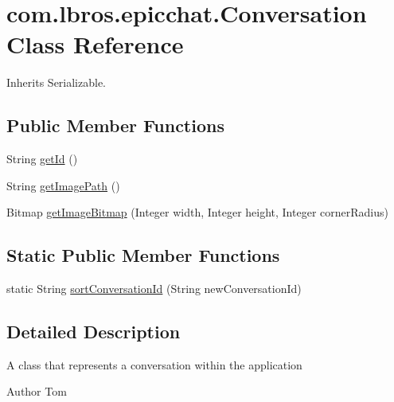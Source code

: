 \hypertarget{classcom_1_1lbros_1_1epicchat_1_1_conversation}{\section{com.\-lbros.\-epicchat.\-Conversation Class Reference}
\label{classcom_1_1lbros_1_1epicchat_1_1_conversation}
}


Inherits Serializable.

\subsection*{Public Member Functions}
\begin{DoxyCompactItemize}
\item 
String \hyperlink{classcom_1_1lbros_1_1epicchat_1_1_conversation_afedabb7d97ff7ba70ed4a9ac8b64130e}{get\-Id} ()
\item 
String \hyperlink{classcom_1_1lbros_1_1epicchat_1_1_conversation_a4fd1f64ac69b7cbab8e0f735c2b09721}{get\-Image\-Path} ()
\item 
Bitmap \hyperlink{classcom_1_1lbros_1_1epicchat_1_1_conversation_a4479dae703dc561e7c74765022fe0348}{get\-Image\-Bitmap} (Integer width, Integer height, Integer corner\-Radius)
\end{DoxyCompactItemize}
\subsection*{Static Public Member Functions}
\begin{DoxyCompactItemize}
\item 
static String \hyperlink{classcom_1_1lbros_1_1epicchat_1_1_conversation_aff70cf16e69f4caa31dc536de2e69b94}{sort\-Conversation\-Id} (String new\-Conversation\-Id)
\end{DoxyCompactItemize}


\subsection{Detailed Description}
A class that represents a conversation within the application \begin{DoxyAuthor}{Author}
Tom 
\end{DoxyAuthor}


